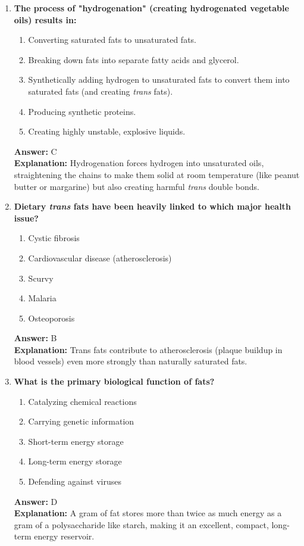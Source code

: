 \documentclass[11pt, a4paper]{article}
\begin{document}
\begin{enumerate}
\item \textbf{The process of "hydrogenation" (creating hydrogenated vegetable oils) results in:}
\begin{enumerate}[label=\Alph*.]
    \item Converting saturated fats to unsaturated fats.
    \item Breaking down fats into separate fatty acids and glycerol.
    \item Synthetically adding hydrogen to unsaturated fats to convert them into saturated fats (and creating \textit{trans} fats).
    \item Producing synthetic proteins.
    \item Creating highly unstable, explosive liquids.
\end{enumerate}
\textbf{Answer:} C \\
\textbf{Explanation:} Hydrogenation forces hydrogen into unsaturated oils, straightening the chains to make them solid at room temperature (like peanut butter or margarine) but also creating harmful \textit{trans} double bonds.

\item \textbf{Dietary \textit{trans} fats have been heavily linked to which major health issue?}
\begin{enumerate}[label=\Alph*.]
    \item Cystic fibrosis
    \item Cardiovascular disease (atherosclerosis)
    \item Scurvy
    \item Malaria
    \item Osteoporosis
\end{enumerate}
\textbf{Answer:} B \\
\textbf{Explanation:} Trans fats contribute to atherosclerosis (plaque buildup in blood vessels) even more strongly than naturally saturated fats.

\item \textbf{What is the primary biological function of fats?}
\begin{enumerate}[label=\Alph*.]
    \item Catalyzing chemical reactions
    \item Carrying genetic information
    \item Short-term energy storage
    \item Long-term energy storage
    \item Defending against viruses
\end{enumerate}
\textbf{Answer:} D \\
\textbf{Explanation:} A gram of fat stores more than twice as much energy as a gram of a polysaccharide like starch, making it an excellent, compact, long-term energy reservoir.


\end{enumerate}
\end{document}
